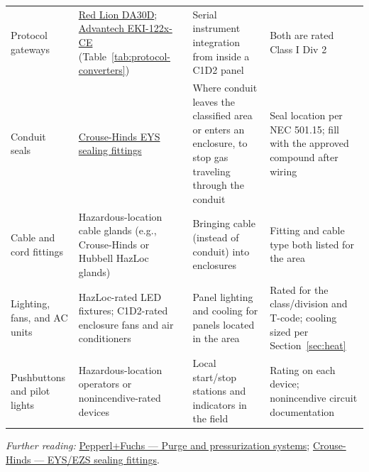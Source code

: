 \begin{longtable}{@{}P{3.17cm}P{4.85cm}P{4.44cm}P{4.02cm}@{}}
Protocol gateways & \href{https://cdn.logic-control.com/docs/red-lion/Datasheets/Data\%20Stations/DA10D_and_DA30D_Datasheet.pdf}{Red Lion DA30D}; \href{https://www.automationdirect.com/adc/shopping/catalog/communications/protocol_gateways/modbus_gateways/eki-1222-ce}{Advantech EKI-122x-CE} (Table~\ref{tab:protocol-converters}) & Serial instrument integration from inside a C1D2 panel & Both are rated Class I Div 2 \\
Conduit seals & \href{https://www.eaton.com/content/dam/eaton/products/conduit-cable-and-wire-management/crouse-hinds/catalog-pages/crouse-hinds-eys-ezs-conduit-sealing-fittings-catalog-page.pdf}{Crouse-Hinds EYS sealing fittings} & Where conduit leaves the classified area or enters an enclosure, to stop gas traveling through the conduit & Seal location per NEC 501.15; fill with the approved compound after wiring \\
Cable and cord fittings & Hazardous-location cable glands (e.g., Crouse-Hinds or Hubbell HazLoc glands) & Bringing cable (instead of conduit) into enclosures & Fitting and cable type both listed for the area \\
Lighting, fans, and AC units & HazLoc-rated LED fixtures; C1D2-rated enclosure fans and air conditioners & Panel lighting and cooling for panels located in the area & Rated for the class/division and T-code; cooling sized per Section~\ref{sec:heat} \\
Pushbuttons and pilot lights & Hazardous-location operators or nonincendive-rated devices & Local start/stop stations and indicators in the field & Rating on each device; nonincendive circuit documentation \\
\bottomrule
\end{longtable}

\textit{Further reading:} \href{https://www.pepperl-fuchs.com/en-us/products/hazardous-area-products-and-solutions/purge-and-pressurization-systems-gp32661}{Pepperl+Fuchs --- Purge and pressurization systems}; \href{https://www.eaton.com/content/dam/eaton/products/conduit-cable-and-wire-management/crouse-hinds/catalog-pages/crouse-hinds-eys-ezs-conduit-sealing-fittings-catalog-page.pdf}{Crouse-Hinds --- EYS/EZS sealing fittings}.
